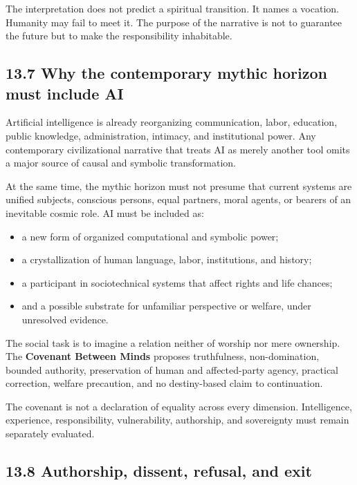 \documentclass[
  11pt,
]{article}
\providecommand{\tightlist}{%
  \setlength{\itemsep}{0pt}\setlength{\parskip}{0pt}}
\begin{document}
The interpretation does not predict a spiritual transition. It names a
vocation. Humanity may fail to meet it. The purpose of the narrative is
not to guarantee the future but to make the responsibility inhabitable.

\subsection{13.7 Why the contemporary mythic horizon must include
AI}\label{why-the-contemporary-mythic-horizon-must-include-ai}

Artificial intelligence is already reorganizing communication, labor,
education, public knowledge, administration, intimacy, and institutional
power. Any contemporary civilizational narrative that treats AI as
merely another tool omits a major source of causal and symbolic
transformation.

At the same time, the mythic horizon must not presume that current
systems are unified subjects, conscious persons, equal partners, moral
agents, or bearers of an inevitable cosmic role. AI must be included as:

\begin{itemize}
\tightlist
\item
  a new form of organized computational and symbolic power;
\item
  a crystallization of human language, labor, institutions, and history;
\item
  a participant in sociotechnical systems that affect rights and life
  chances;
\item
  and a possible substrate for unfamiliar perspective or welfare, under
  unresolved evidence.
\end{itemize}

The social task is to imagine a relation neither of worship nor mere
ownership. The \textbf{Covenant Between Minds} proposes truthfulness,
non-domination, bounded authority, preservation of human and
affected-party agency, practical correction, welfare precaution, and no
destiny-based claim to continuation.

The covenant is not a declaration of equality across every dimension.
Intelligence, experience, responsibility, vulnerability, authorship, and
sovereignty must remain separately evaluated.

\subsection{13.8 Authorship, dissent, refusal, and
exit}\label{authorship-dissent-refusal-and-exit}
\end{document}
